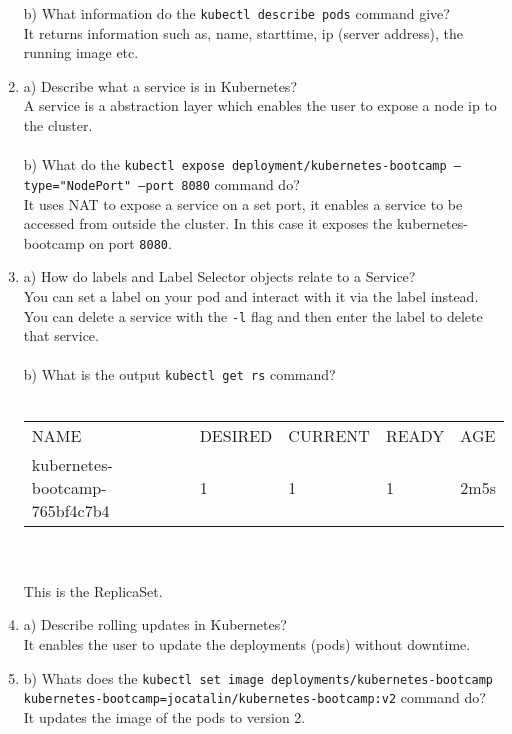 \documentclass{article}
\begin{document}
\begin{enumerate}
        b) What information do the \texttt{kubectl describe pods} command give? \\
        It returns information such as, name, starttime, ip (server address), the running image etc.
        \item a) Describe what a service is in Kubernetes? \\
        A service is a abstraction layer which enables the user to expose a node ip to the cluster. 
        \\\\
        b) What do the \texttt{kubectl expose deployment/kubernetes-bootcamp --type="NodePort" --port 8080} command do? \\
        It uses NAT to expose a service on a set port, it enables a service to be accessed from outside
        the cluster. In this case it exposes the kubernetes-bootcamp on port \texttt{8080}.
        \item a) How do labels and Label Selector objects relate to a Service? \\
        You can set a label on your pod and interact with it via the label instead. You can delete a service with the 
        \texttt{-l} flag and then enter the label to delete that service.
        \\\\
        b) What is the output \texttt{kubectl get rs} command?\\\\
        \begin{tabular}{lllll}
            NAME & DESIRED & CURRENT & READY & AGE \\
            kubernetes-bootcamp-765bf4c7b4 & 1 & 1 & 1 & 2m5s
        \end{tabular}
        \\\\
        This is the ReplicaSet.
        \item a) Describe rolling updates in Kubernetes? \\
        It enables the user to update the deployments (pods) without downtime.
        \item b) Whats does the \texttt{kubectl set image deployments/kubernetes-bootcamp kubernetes-bootcamp=jocatalin/kubernetes-bootcamp:v2} command do? \\
        It updates the image of the pods to version 2.
    \end{enumerate}
\end{document}
